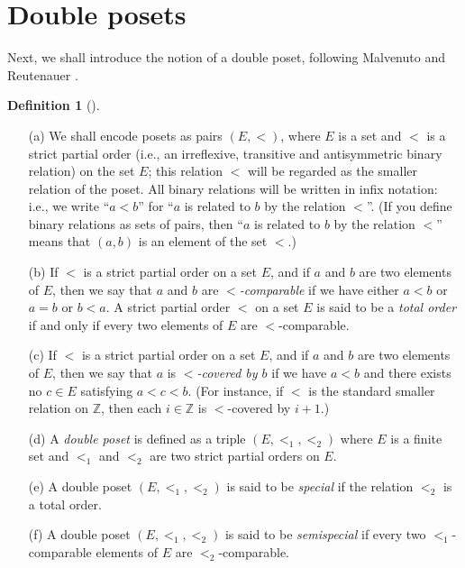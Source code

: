 \documentclass[numbers=enddot,12pt,final,onecolumn,notitlepage,abstracton]{scrartcl}%
\theoremstyle{definition}
\newtheorem{defi}[theo]{Definition}
\newenvironment{definition}[1][]
{\begin{defi}[#1]\begin{leftbar}}
{\end{leftbar}\end{defi}}
\newcommand{\ZZ}{{\mathbb{Z}}}
\begin{document}
\section{Double posets}
\label{sect.double-posets}

Next, we shall introduce the notion of a double poset, following
Malvenuto and Reutenauer \cite{Mal-Reu-DP}.

\begin{definition}
\label{def.double-poset}
\begin{itemize}

\item[(a)] We shall encode posets as pairs $\left(E, <\right)$,
where $E$ is a set and $<$ is a strict partial order
(i.e., an irreflexive, transitive and antisymmetric
binary relation) on the set $E$; this relation $<$ will be regarded
as the smaller relation of the poset. All binary relations will be
written in infix notation: i.e., we write ``$a < b$'' for ``$a$ is
related to $b$ by the relation $<$''. (If you define binary relations
as sets of pairs, then ``$a$ is related to $b$ by the relation $<$''
means that $\left(a,b\right)$ is an element of the set $<$.)

\item[(b)] If $<$ is a strict partial order on a set $E$,
and if $a$ and $b$ are two elements of $E$, then we say that
$a$ and $b$ are \textit{$<$-comparable} if we have either $a < b$
or $a = b$ or $b < a$. A strict partial order $<$ on a
set $E$ is said to be a \textit{total order} if and only
if every two elements of $E$ are $<$-comparable.

\item[(c)] If $<$ is a strict partial order on a set $E$,
and if $a$ and $b$ are two elements of $E$, then we say that
$a$ is \textit{$<$-covered by $b$} if we have $a < b$ and there
exists no $c \in E$ satisfying $a < c < b$. (For instance, if $<$
is the standard smaller relation on $\ZZ$, then each
$i \in \ZZ$ is $<$-covered by $i+1$.)

\item[(d)] A \textit{double poset} is defined as a triple
$\left(E, <_1, <_2\right)$ where $E$ is a finite set and $<_1$ and
$<_2$ are two strict partial orders on $E$.

\item[(e)] A double poset
$\left(E, <_1, <_2\right)$ is said to be \textit{special} if
the relation $<_2$ is a total order.

\item[(f)] A double poset
$\left(E, <_1, <_2\right)$ is said to be \textit{semispecial} if
every two $<_1$-comparable elements of $E$ are $<_2$-comparable.


\end{itemize}
\end{definition}
\end{document}
